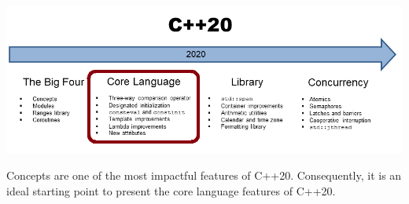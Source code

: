 
\begin{center}
\includegraphics[width=1.0\textwidth]{content/3/chapter4/images/1.png}\\
\end{center}

Concepts are one of the most impactful features of C++20. Consequently, it is an ideal starting point to present the core language features of C++20.
